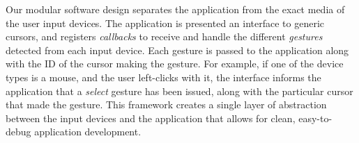 \documentclass[runningheads,a4paper]{llncs}
\begin{document}


Our modular software design separates the application from the exact media of the user input devices.
The application is presented an interface to generic cursors,
and
%
registers {\em callbacks} 
to receive and handle the different {\em gestures} detected
from each
input device.
Each gesture is passed to the application along with the ID of the cursor making the gesture.
For example, if one of the device types is a
mouse, and the user left-clicks with it, the interface informs the
application that a {\em select} gesture has been issued, along with the
particular cursor that made the gesture.
% 
This framework creates a single layer of abstraction between the input
devices and the application 
that allows for clean, easy-to-debug application development.
\end{document}
